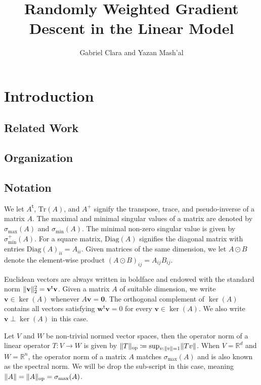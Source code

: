 \documentclass{article}
\title{Randomly Weighted Gradient Descent in the Linear Model}
\author{Gabriel Clara and Yazan Mash'al}
\newcommand*{\R}{\mathbb{R}}
\newcommand*{\bfv}{\mathbf{v}}
\newcommand*{\bfw}{\mathbf{w}}
\newcommand*{\bfzero}{\mathbf{0}}
\newcommand*{\pinv}{^{+}}
\newcommand*{\tran}{^{\mathsf{t}}}
\newcommand*{\sigmax}{\sigma_{\mathrm{max}}}
\newcommand*{\sigmin}{\sigma_{\mathrm{min}}}
\newcommand*{\sigminp}{\sigma_{\mathrm{min}}^+}
\DeclarePairedDelimiter{\norm}{\lVert}{\rVert}
\newcommand*{\Diag}{\mathrm{Diag}}
\newcommand*{\Tr}{\mathrm{Tr}}
\newcommand*{\op}{\mathrm{op}}
\begin{document}
\maketitle

\begin{abstract}
  
\end{abstract}

\section{Introduction}

\subsection{Related Work}

\subsection{Organization}

\subsection{Notation}

We let $A\tran$, $\Tr(A)$, and $A\pinv$ signify the transpose, trace, and
pseudo-inverse of a matrix $A$. The maximal and minimal singular values of a
matrix are denoted by $\sigmax(A)$ and $\sigmin(A)$. The minimal non-zero
singular value is given by $\sigminp(A)$. For a square matrix, $\Diag(A)$
signifies the diagonal matrix with entries $\Diag(A)_{ii} = A_{ii}$. Given
matrices of the same dimension, we let $A \odot B$ denote the element-wise
product $(A \odot B)_{ij} = A_{ij} B_{ij}$.

Euclidean vectors are always written in boldface and endowed with the standard
norm $\norm{\bfv}_2^2 = \bfv\tran \bfv$. Given a matrix $A$ of suitable
dimension, we write $\bfv \in \ker(A)$ whenever $A \bfv = \bfzero$. The
orthogonal complement of $\ker(A)$ contains all vectors satisfying $\bfw\tran
\bfv = 0$ for every $\bfv \in \ker(A)$. We also write $\bfv \perp \ker(A)$ in
this case.

Let $V$ and $W$ be non-trivial normed vector spaces, then the operator norm of a
linear operator $T : V \to W$ is given by $\norm{T}_{\op} \coloneq \sup_{v :
\norm{v} = 1} \norm{T v}$. When $V = \R^d$ and $W = \R^n$, the operator norm of
a matrix $A$ matches $\sigmax(A)$ and is also known as the spectral norm. We
will be drop the sub-script in this case, meaning $\norm{A} = \norm{A}_{\op} =
\sigmax(A)$.
\end{document}
